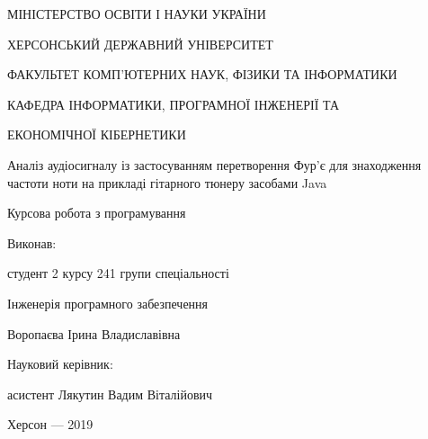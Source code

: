 \thispagestyle{empty}

{\centering
МІНІСТЕРСТВО ОСВІТИ І НАУКИ УКРАЇНИ

ХЕРСОНСЬКИЙ ДЕРЖАВНИЙ УНІВЕРСИТЕТ

ФАКУЛЬТЕТ КОМП'ЮТЕРНИХ НАУК, ФІЗИКИ ТА ІНФОРМАТИКИ

КАФЕДРА ІНФОРМАТИКИ, ПРОГРАМНОЇ ІНЖЕНЕРІЇ ТА 

ЕКОНОМІЧНОЇ КІБЕРНЕТИКИ

\vfill

Аналіз аудіосигналу із застосуванням перетворення Фур'є для знаходження частоти ноти на прикладі гітарного тюнеру засобами Java

Курсова робота з програмування

}

\vfill

\hfill\begin{minipage}[t]{0.6\textwidth}
Виконав: 

студент 2 курсу 241 групи спеціальності

Інженерія програмного забезпечення

Воропаєва Ірина Владиславівна

Науковий керівник:

асистент Лякутин Вадим Віталійович

\end{minipage}

\vfill

{\centering
Херсон --- 2019

}